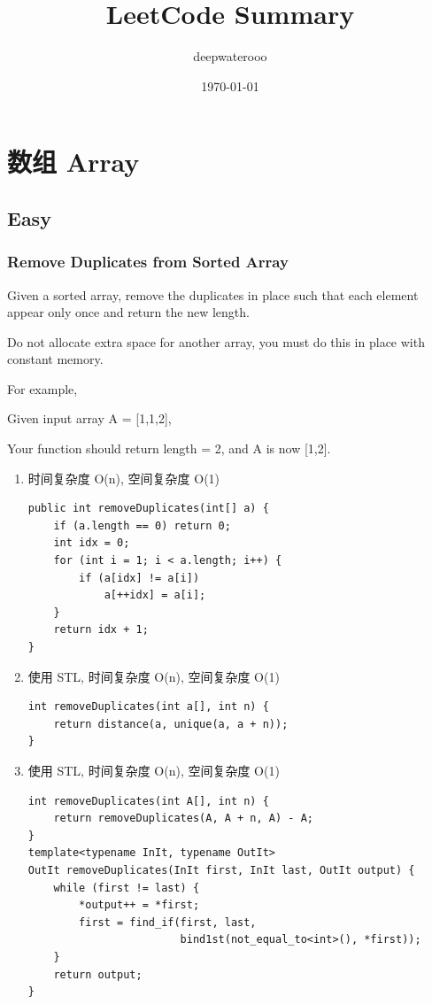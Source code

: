 \documentclass[12pt]{book}
\author{deepwaterooo}
\date{\today}
\title{LeetCode Summary}
\begin{document}
\maketitle
\tableofcontents


\chapter{数组 Array}
\label{sec-1}
\section{Easy}
\label{sec-1-1}
\subsection{Remove Duplicates from Sorted Array}
\label{sec-1-1-1}
Given a sorted array, remove the duplicates in place such that each element appear only once and return the new length.

Do not allocate extra space for another array, you must do this in place with constant memory.

For example,

Given input array A = [1,1,2],

Your function should return length = 2, and A is now [1,2].

\begin{enumerate}
\item 时间复杂度 O(n), 空间复杂度 O(1)
\label{sec-1-1-1-1}
\lstset{language=java,label= ,caption= ,numbers=none}
\begin{lstlisting}
public int removeDuplicates(int[] a) {
    if (a.length == 0) return 0;
    int idx = 0;
    for (int i = 1; i < a.length; i++) {
        if (a[idx] != a[i])
            a[++idx] = a[i];
    }
    return idx + 1;
}
\end{lstlisting}
\item 使用 STL, 时间复杂度 O(n), 空间复杂度 O(1)
\label{sec-1-1-1-2}
\lstset{language=java,label= ,caption= ,numbers=none}
\begin{lstlisting}
int removeDuplicates(int a[], int n) {
    return distance(a, unique(a, a + n));
}
\end{lstlisting}
\item 使用 STL, 时间复杂度 O(n), 空间复杂度 O(1)
\label{sec-1-1-1-3}
\lstset{language=java,label= ,caption= ,numbers=none}
\begin{lstlisting}
int removeDuplicates(int A[], int n) {
    return removeDuplicates(A, A + n, A) - A;
}
template<typename InIt, typename OutIt>
OutIt removeDuplicates(InIt first, InIt last, OutIt output) {
    while (first != last) {
        *output++ = *first;
        first = find_if(first, last,
                        bind1st(not_equal_to<int>(), *first));
    }
    return output;
}
\end{lstlisting}
\end{enumerate}
\end{document}
